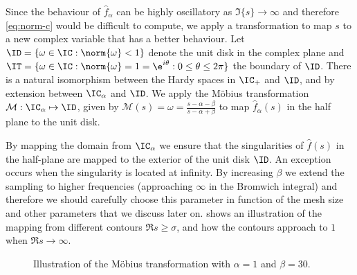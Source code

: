 Since the behaviour of $\widehat{f}_\alpha$ can be highly oscillatory as
$\Im \{s\}\rightarrow\infty$ and therefore \cref{eq:norm-c} would be difficult to compute, we apply a transformation to map $s$ to a new complex variable that has a better behaviour. Let $\ID = \{ \omega \in  \IC :\norm{\omega}<1 \}$ denote the unit disk in the complex plane and $\IT = \{ \omega \in \IC :\norm{\omega}=1 = \e^{i\theta}: 0\leq \theta \leq 2\pi \}$ the boundary of $\ID$. There is a natural isomorphism between the Hardy spaces in $\IC_+$ and $\ID$, and by extension between $\IC_\alpha$ and $\ID$. We apply the Möbius transformation $\mathcal{M}:\IC_\alpha \mapsto \ID$, given by $\mathcal{M}(s) = \omega = \frac{s-\alpha-\beta}{s-\alpha+\beta}$ to map $\widehat{f}_\alpha(s)$ in the half plane to the unit disk.

By mapping the domain from $\IC_\alpha$ we ensure that the singularities of $\widehat{f}(s)$ in the half-plane are mapped to the exterior of the unit disk $\ID$. An exception occurs when the singularity is located at infinity. By increasing $\beta$ we extend the sampling to higher frequencies (approaching $\infty$ in the Bromwich integral) and therefore we should carefully choose this parameter in function of the mesh size and other parameters that we discuss later on.
 shows an illustration of the mapping from different contours $\Re s \geq \sigma$, and how the contours approach to $1$ when $\Re s \rightarrow \infty$. 
\begin{figure}[ht]
    \centering
    
    \vspace{-1cm}
    \caption{Illustration of the Möbius transformation with $\alpha=1$ and $\beta=30$.}
    \label{fig:mobius}
\end{figure}

